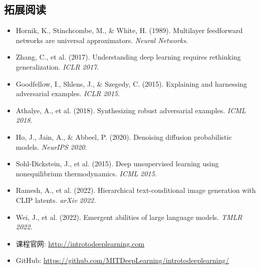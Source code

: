\subsection{拓展阅读}

\begin{itemize}
    \item Hornik, K., Stinchcombe, M., \& White, H. (1989). Multilayer feedforward networks are universal approximators. \textit{Neural Networks}.
    \item Zhang, C., et al. (2017). Understanding deep learning requires rethinking generalization. \textit{ICLR 2017}.
    \item Goodfellow, I., Shlens, J., \& Szegedy, C. (2015). Explaining and harnessing adversarial examples. \textit{ICLR 2015}.
    \item Athalye, A., et al. (2018). Synthesizing robust adversarial examples. \textit{ICML 2018}.
    \item Ho, J., Jain, A., \& Abbeel, P. (2020). Denoising diffusion probabilistic models. \textit{NeurIPS 2020}.
    \item Sohl-Dickstein, J., et al. (2015). Deep unsupervised learning using nonequilibrium thermodynamics. \textit{ICML 2015}.
    \item Ramesh, A., et al. (2022). Hierarchical text-conditional image generation with CLIP latents. \textit{arXiv 2022}.
    \item Wei, J., et al. (2022). Emergent abilities of large language models. \textit{TMLR 2022}.
    \item 课程官网: \url{http://introtodeeplearning.com}
    \item GitHub: \url{https://github.com/MITDeepLearning/introtodeeplearning/}
\end{itemize}



